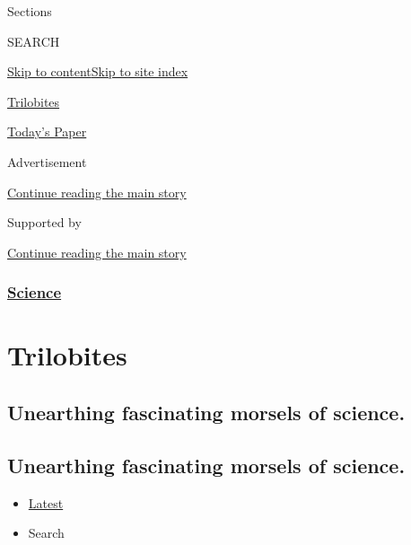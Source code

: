 Sections

SEARCH

\protect\hyperlink{site-content}{Skip to
content}\protect\hyperlink{site-index}{Skip to site index}

\href{https://www.nytimes.com/column/trilobites}{Trilobites}

\href{https://myaccount.nytimes.com/auth/login?response_type=cookie\&client_id=vi}{}

\href{https://www.nytimes.com/section/todayspaper}{Today's Paper}

Advertisement

\protect\hyperlink{after-top}{Continue reading the main story}

Supported by

\protect\hyperlink{after-sponsor}{Continue reading the main story}

\hypertarget{science}{%
\subsubsection{\texorpdfstring{\href{/section/science}{Science}}{Science}}\label{science}}

\hypertarget{trilobites}{%
\section{Trilobites}\label{trilobites}}

\hypertarget{unearthing-fascinating-morsels-of-science}{%
\subsection{Unearthing fascinating morsels of
science.}\label{unearthing-fascinating-morsels-of-science}}

\hypertarget{unearthing-fascinating-morsels-of-science-1}{%
\subsection{Unearthing fascinating morsels of
science.}\label{unearthing-fascinating-morsels-of-science-1}}

\begin{itemize}
\tightlist
\item
  \protect\hyperlink{stream-panel}{Latest}
\item
  Search
\end{itemize}

